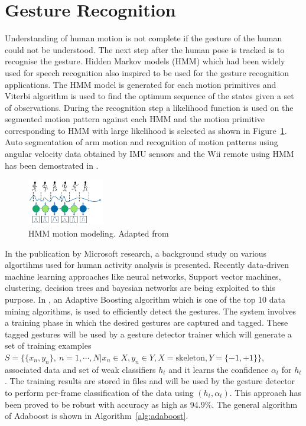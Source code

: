 \section{Gesture Recognition}
	Understanding of human motion is not complete if the gesture of the human could not be understood. The next step after the human pose is tracked is to recognise the gesture. Hidden Markov models (HMM) which had been widely used for speech recognition\cite{Rabiner1990} also inspired to be used for the gesture recognition applications. The HMM model is generated for each motion primitives and Viterbi algorithm is used to find the optimum sequence of the states given a set of observations. During the recognition step a likelihood function is used on the segmented motion pattern against each HMM and the motion primitive corresponding to HMM with large likelihood is selected as shown in Figure~\ref{fig:hmm}. Auto segmentation of arm motion and recognition of motion patterns using angular velocity data obtained by IMU sensors and the Wii remote using HMM has been demostrated in \cite{Aoki2013}. 
\begin{figure}[H]
\centering
\includegraphics[width=0.3\textwidth]{assets/HMM.png}
\caption[HMM motion modeling]{HMM motion modeling. {Adapted from \cite{Aoki2013}}}
\label{fig:hmm}
\end{figure}
	In the publication by Microsoft research\cite{KinectCV2013}, a background study on various algortihms used for human activity analysis is presented. Recently\cite{KinectSDK2014} data-driven machine learning approaches like neural networks, Support vector machines, clustering, decision trees and bayesian networks are being exploited to this purpose. In \cite{KinectSDK2014}, an Adaptive Boosting algorithm\cite{Freund1997119} which is one of the top 10 data mining algorithms, is used to efficiently detect the gestures. The system involves a training phase in which the desired gestures are captured and tagged. These tagged gestures will be used by a gesture detector trainer which will generate a set of training examples $S=\lbrace \lbrace x_n,y_n \rbrace,\ n=1,\cdots,N \vert x_n\in X,y_n\in Y, X=\text{skeleton},Y=\lbrace -1,+1 \rbrace\rbrace$, associated data and set of weak classifiers $h_t$ and it learns the confidence $\alpha_t$ for $h_t$. The training results are stored in files and will be used by the gesture detector to perform per-frame classification of the data using $(h_t,\alpha_t)$. This approach has been proved to be robust with accuracy as high as 94.9\%. The general algorithm of Adaboost is shown in Algorithm~\ref{alg:adaboost}. \\
